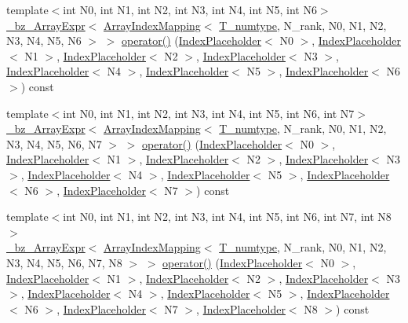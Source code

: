 \begin{DoxyCompactItemize}
\item 
{\footnotesize template$<$int N0, int N1, int N2, int N3, int N4, int N5, int N6$>$ }\\\hyperlink{class__bz__ArrayExpr}{\+\_\+bz\+\_\+\+Array\+Expr}$<$ \hyperlink{classArrayIndexMapping}{Array\+Index\+Mapping}$<$ \hyperlink{classArray_ae72770f4a1d2f8b7193badafc320f008}{T\+\_\+numtype}, N\+\_\+rank, N0, N1, N2, N3, N4, N5, N6 $>$ $>$ \hyperlink{classArray_a7dead88752f62a18deffc85a09ea96ec}{operator()} (\hyperlink{classIndexPlaceholder}{Index\+Placeholder}$<$ N0 $>$, \hyperlink{classIndexPlaceholder}{Index\+Placeholder}$<$ N1 $>$, \hyperlink{classIndexPlaceholder}{Index\+Placeholder}$<$ N2 $>$, \hyperlink{classIndexPlaceholder}{Index\+Placeholder}$<$ N3 $>$, \hyperlink{classIndexPlaceholder}{Index\+Placeholder}$<$ N4 $>$, \hyperlink{classIndexPlaceholder}{Index\+Placeholder}$<$ N5 $>$, \hyperlink{classIndexPlaceholder}{Index\+Placeholder}$<$ N6 $>$) const 
\item 
{\footnotesize template$<$int N0, int N1, int N2, int N3, int N4, int N5, int N6, int N7$>$ }\\\hyperlink{class__bz__ArrayExpr}{\+\_\+bz\+\_\+\+Array\+Expr}$<$ \hyperlink{classArrayIndexMapping}{Array\+Index\+Mapping}$<$ \hyperlink{classArray_ae72770f4a1d2f8b7193badafc320f008}{T\+\_\+numtype}, N\+\_\+rank, N0, N1, N2, N3, N4, N5, N6, N7 $>$ $>$ \hyperlink{classArray_a4df906d3946b0cc48865fa2c6717f09e}{operator()} (\hyperlink{classIndexPlaceholder}{Index\+Placeholder}$<$ N0 $>$, \hyperlink{classIndexPlaceholder}{Index\+Placeholder}$<$ N1 $>$, \hyperlink{classIndexPlaceholder}{Index\+Placeholder}$<$ N2 $>$, \hyperlink{classIndexPlaceholder}{Index\+Placeholder}$<$ N3 $>$, \hyperlink{classIndexPlaceholder}{Index\+Placeholder}$<$ N4 $>$, \hyperlink{classIndexPlaceholder}{Index\+Placeholder}$<$ N5 $>$, \hyperlink{classIndexPlaceholder}{Index\+Placeholder}$<$ N6 $>$, \hyperlink{classIndexPlaceholder}{Index\+Placeholder}$<$ N7 $>$) const 
\item 
{\footnotesize template$<$int N0, int N1, int N2, int N3, int N4, int N5, int N6, int N7, int N8$>$ }\\\hyperlink{class__bz__ArrayExpr}{\+\_\+bz\+\_\+\+Array\+Expr}$<$ \hyperlink{classArrayIndexMapping}{Array\+Index\+Mapping}$<$ \hyperlink{classArray_ae72770f4a1d2f8b7193badafc320f008}{T\+\_\+numtype}, N\+\_\+rank, N0, N1, N2, N3, N4, N5, N6, N7, N8 $>$ $>$ \hyperlink{classArray_a1ce872f557eaefa08ba55e4e0aa5c34c}{operator()} (\hyperlink{classIndexPlaceholder}{Index\+Placeholder}$<$ N0 $>$, \hyperlink{classIndexPlaceholder}{Index\+Placeholder}$<$ N1 $>$, \hyperlink{classIndexPlaceholder}{Index\+Placeholder}$<$ N2 $>$, \hyperlink{classIndexPlaceholder}{Index\+Placeholder}$<$ N3 $>$, \hyperlink{classIndexPlaceholder}{Index\+Placeholder}$<$ N4 $>$, \hyperlink{classIndexPlaceholder}{Index\+Placeholder}$<$ N5 $>$, \hyperlink{classIndexPlaceholder}{Index\+Placeholder}$<$ N6 $>$, \hyperlink{classIndexPlaceholder}{Index\+Placeholder}$<$ N7 $>$, \hyperlink{classIndexPlaceholder}{Index\+Placeholder}$<$ N8 $>$) const 

\end{DoxyCompactItemize}
